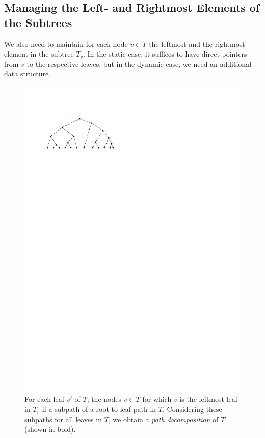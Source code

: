 \documentclass[a4paper,11pt]{article}
\newcommand{\?}{\mskip1.5mu}
\begin{document}
\subsection{Managing the Left- and Rightmost Elements 
of the Subtrees}

We also need to maintain for each node $v \in T$ the
leftmost and the rightmost element in the subtree $T_v$.
In the static case, it suffices to have direct pointers
from $v$ to the respective leaves, but
in the dynamic case, we need an additional data structure. 

\begin{figure}
\centering
\includegraphics{pathdecomp}
\caption{For each leaf $v'$ of $T$, the nodes
$v \in T$ for which $v$ is the leftmost leaf in $T_v$
if a subpath of a root-to-leaf path in $T$. Considering these
subpaths for all leaves in $T$, we obtain a \emph{path decomposition}
of $T$ (shown in bold).}
\label{fig:pathdecomp}
\end{figure}
\end{document}
